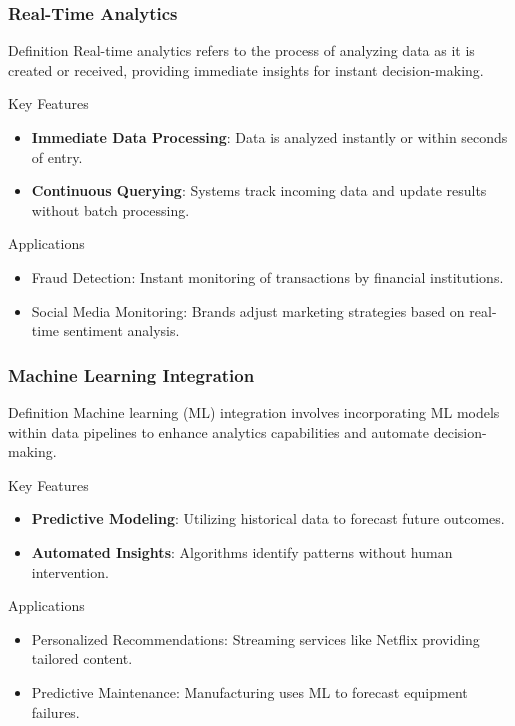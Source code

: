 \documentclass[aspectratio=169]{beamer}
\begin{document}
\begin{frame}[fragile]
    \frametitle{Real-Time Analytics}
    \begin{block}{Definition}
        Real-time analytics refers to the process of analyzing data as it is created or received, providing immediate insights for instant decision-making.
    \end{block}
    
    \begin{block}{Key Features}
        \begin{itemize}
            \item \textbf{Immediate Data Processing}: Data is analyzed instantly or within seconds of entry.
            \item \textbf{Continuous Querying}: Systems track incoming data and update results without batch processing.
        \end{itemize}
    \end{block}

    \begin{block}{Applications}
        \begin{itemize}
            \item Fraud Detection: Instant monitoring of transactions by financial institutions.
            \item Social Media Monitoring: Brands adjust marketing strategies based on real-time sentiment analysis.
        \end{itemize}
    \end{block}
\end{frame}

\begin{frame}[fragile]
    \frametitle{Machine Learning Integration}
    \begin{block}{Definition}
        Machine learning (ML) integration involves incorporating ML models within data pipelines to enhance analytics capabilities and automate decision-making.
    \end{block}

    \begin{block}{Key Features}
        \begin{itemize}
            \item \textbf{Predictive Modeling}: Utilizing historical data to forecast future outcomes.
            \item \textbf{Automated Insights}: Algorithms identify patterns without human intervention.
        \end{itemize}
    \end{block}

    \begin{block}{Applications}
        \begin{itemize}
            \item Personalized Recommendations: Streaming services like Netflix providing tailored content.
            \item Predictive Maintenance: Manufacturing uses ML to forecast equipment failures.
        \end{itemize}
    \end{block}
\end{frame}
\end{document}
